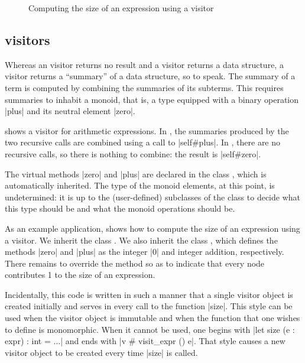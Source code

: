\documentclass[11pt,a4paper,twoside]{article}
\begin{document}
\begin{figure}[t]
\caption{Computing the size of an expression using a \reduce visitor}
\label{fig:reduce}
\end{figure}

\subsection{\reduce visitors}
\label{sec:intro:reduce}

Whereas an \iter visitor returns no result and a \map visitor returns a data
structure, a \reduce visitor returns a ``summary'' of a data structure, so to
speak. The summary of a term is computed by combining the summaries of its
subterms. This requires summaries to inhabit a monoid, that is, a type
equipped with a binary operation \oc|plus| and its neutral element \oc|zero|.

 shows a \reduce visitor for arithmetic expressions. In
, the summaries produced by the two recursive calls are
combined using a call to \oc|self#plus|. In , there are
no recursive calls, so there is nothing to combine: the result is
\oc|self#zero|.

The virtual methods \oc|zero| and \oc|plus| are declared in the class
, which is automatically inherited. The type of the
monoid elements, at this point, is undetermined: it is up to the
(user-defined) subclasses of the class \reduce to decide what this type should
be and what the monoid operations should be.

As an example application,  shows how to compute the size of
an expression using a \reduce visitor. We inherit the class \reduce. We also
inherit the class , which defines the
methods \oc|zero| and \oc|plus| as the integer \oc|0| and integer addition,
respectively. There remains to override the method  so as
to indicate that every node contributes 1 to the size of an expression.

Incidentally, this code is written in such a manner that a single visitor
object is created initially and serves in every call to the function
\oc|size|. This style can be used when the visitor object is immutable and
when the function that one wishes to define is monomorphic. When it cannot be
used, one begins with \oc|let size (e : expr) : int = ...| and ends with %
\oc|v # visit_expr () e|. That style causes a new visitor object to be created
every time \oc|size| is called.
\end{document}
